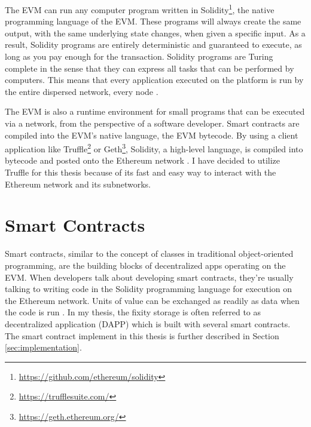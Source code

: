 The EVM can run any computer program written in Solidity\footnote{\url{https://github.com/ethereum/solidity}}, the native programming language of the EVM. These programs will always create the same output, with the same underlying state changes, when given a specific input. As a result, Solidity programs are entirely deterministic and guaranteed to execute, as long as you pay enough for the transaction. Solidity programs are Turing complete in the sense that they can express all tasks that can be performed by computers. This means that every application executed on the platform is run by the entire dispersed network, every node \cite[50]{dannen2017introducing}.

The EVM is also a runtime environment for small programs that can be executed via a network, from the perspective of a software developer. Smart contracts are compiled into the EVM's native language, the EVM bytecode. By using a client application like Truffle\footnote{\url{https://trufflesuite.com/}} or Geth\footnote{\url{https://geth.ethereum.org/}}, Solidity, a high-level language, is compiled into bytecode and posted onto the Ethereum network \cite[51]{dannen2017introducing}. I have decided to utilize Truffle for this thesis because of its fast and easy way to interact with the Ethereum network and its subnetworks.
\section{Smart Contracts}
Smart contracts, similar to the concept of classes in traditional object-oriented programming, are the building blocks of decentralized apps operating on the EVM. When developers talk about developing smart contracts, they're usually talking to writing code in the Solidity programming language for execution on the Ethereum network. Units of value can be exchanged as readily as data when the code is run \cite[10]{dannen2017introducing}.
In my thesis, the fixity storage is often referred to as decentralized application (DAPP) which is built with several smart contracts. The smart contract implement in this thesis is further described in Section \ref{sec:implementation}. 

